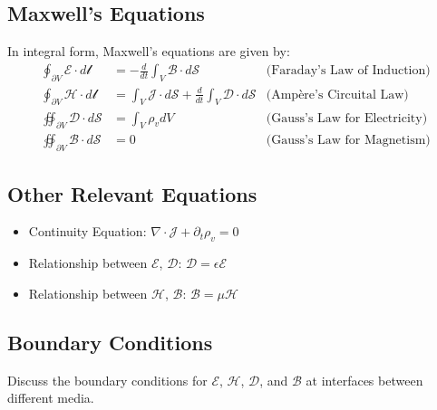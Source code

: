 \documentclass[12pt]{article}
\begin{document}
\subsection*{Maxwell's Equations}
In integral form, Maxwell's equations are given by:
\begin{align}
  \oint_{\partial V} \bm{\mathcal{E}} \cdot d\bm{\mathcal{l}} &= - \frac{d}{dt} \int_{V} \bm{\mathcal{B}} \cdot d\bm{\mathcal{S}} & \text{(Faraday's Law of Induction)} \\
  \oint_{\partial V} \bm{\mathcal{H}} \cdot d\bm{\mathcal{l}} &= \int_{V} \bm{\mathcal{J}} \cdot d\bm{\mathcal{S}} + \frac{d}{dt} \int_{V} \bm{\mathcal{D}} \cdot d\bm{\mathcal{S}} & \text{(Ampère's Circuital Law)} \\
  \oiint_{\partial V} \bm{\mathcal{D}} \cdot d\bm{\mathcal{S}} &= \int_{V} \rho_v dV & \text{(Gauss's Law for Electricity)} \\
  \oiint_{\partial V} \bm{\mathcal{B}} \cdot d\bm{\mathcal{S}} &= 0 & \text{(Gauss's Law for Magnetism)}
\end{align}

\subsection*{Other Relevant Equations}
\begin{itemize}
  \item Continuity Equation: $\nabla \cdot \bm{\mathcal{J}} + \partial_t \rho_v = 0$
  \item Relationship between $\bm{\mathcal{E}}$, $\bm{\mathcal{D}}$: $\bm{\mathcal{D}} = \epsilon \bm{\mathcal{E}}$
  \item Relationship between $\bm{\mathcal{H}}$, $\bm{\mathcal{B}}$: $\bm{\mathcal{B}} = \mu \bm{\mathcal{H}}$
\end{itemize}

\subsection*{Boundary Conditions}
Discuss the boundary conditions for $\bm{\mathcal{E}}$, $\bm{\mathcal{H}}$, $\bm{\mathcal{D}}$, and $\bm{\mathcal{B}}$ at interfaces between different media.
\newpage
\end{document}
